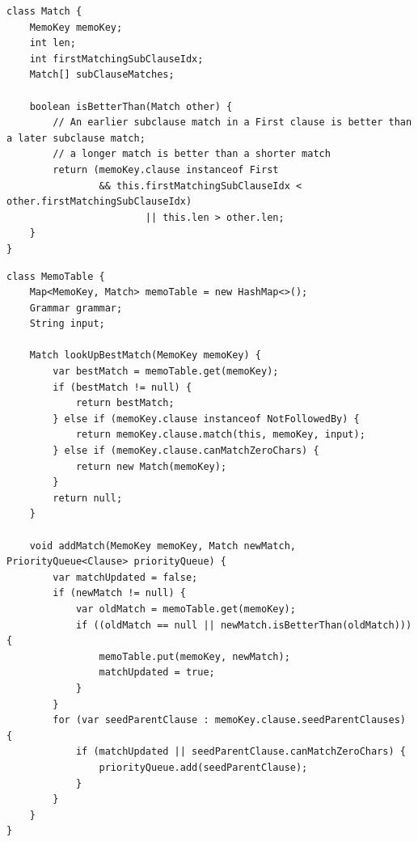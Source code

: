 \documentclass[manuscript,screen]{acmart}
\begin{document}
\begin{lstlisting}[caption={The \texttt{Match} class},label={lst:Match}]
class Match {
    MemoKey memoKey;
    int len;
    int firstMatchingSubClauseIdx;
    Match[] subClauseMatches;

    boolean isBetterThan(Match other) {
        // An earlier subclause match in a First clause is better than a later subclause match;
        // a longer match is better than a shorter match
        return (memoKey.clause instanceof First
                && this.firstMatchingSubClauseIdx < other.firstMatchingSubClauseIdx)
                        || this.len > other.len;
    }
}
\end{lstlisting}

\begin{lstlisting}[caption={The \texttt{MemoTable} class},label={lst:MemoTable}]
class MemoTable {
    Map<MemoKey, Match> memoTable = new HashMap<>();
    Grammar grammar;
    String input;

    Match lookUpBestMatch(MemoKey memoKey) {
        var bestMatch = memoTable.get(memoKey);
        if (bestMatch != null) {
            return bestMatch;
        } else if (memoKey.clause instanceof NotFollowedBy) {
            return memoKey.clause.match(this, memoKey, input);
        } else if (memoKey.clause.canMatchZeroChars) {
            return new Match(memoKey);
        }
        return null;
    }

    void addMatch(MemoKey memoKey, Match newMatch, PriorityQueue<Clause> priorityQueue) {
        var matchUpdated = false;
        if (newMatch != null) {
            var oldMatch = memoTable.get(memoKey);
            if ((oldMatch == null || newMatch.isBetterThan(oldMatch))) {
                memoTable.put(memoKey, newMatch);
                matchUpdated = true;
            }
        }
        for (var seedParentClause : memoKey.clause.seedParentClauses) {
            if (matchUpdated || seedParentClause.canMatchZeroChars) {
                priorityQueue.add(seedParentClause);
            }
        }
    }
}
\end{lstlisting}
\end{document}
